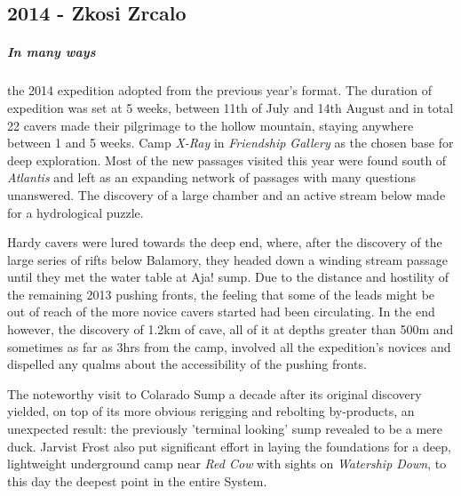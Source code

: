 \newpage
\begin{tcolorbox}
	


\chapter{2014 - Zkosi Zrcalo}
		\paragraph{In many ways} the 2014 expedition adopted from the previous year's format. The duration of expedition was set at 5 weeks, between 11th of July and 14th August and in total 22 cavers made their pilgrimage to the hollow mountain, staying anywhere between 1 and 5 weeks. Camp \emph{X-Ray} in \emph{Friendship Gallery} as the chosen base for deep exploration. Most of the new passages visited this year were found south of \emph{Atlantis} and left as an expanding network of passages with many questions unanswered. The discovery of a large chamber and an active stream below made for a hydrological puzzle. 

		Hardy cavers were lured towards the deep end, where, after the discovery of the large series of rifts below Balamory, they headed down a winding stream passage until they met the water table at Aja! sump.  Due to the distance and hostility of the remaining 2013 pushing fronts, the feeling that some of the leads might be out of reach of the more novice cavers started had been circulating. In the end however, the discovery of 1.2km of cave, all of it at depths greater than 500m and sometimes as far as 3hrs from the camp, involved all the expedition's novices and dispelled any qualms about the accessibility of the pushing fronts.

 		The noteworthy visit to Colarado Sump a decade after its original discovery yielded, on top of its more obvious rerigging and rebolting by-products, an unexpected result: the previously 'terminal looking' sump revealed to be a mere duck. Jarvist Frost also put significant effort in laying the foundations for a deep, lightweight underground camp near \emph{Red Cow} with sights on \emph{Watership Down}, to this day the deepest point in the entire System.
		\\
		\\
		\\
		
\end{tcolorbox}
\BgThispage